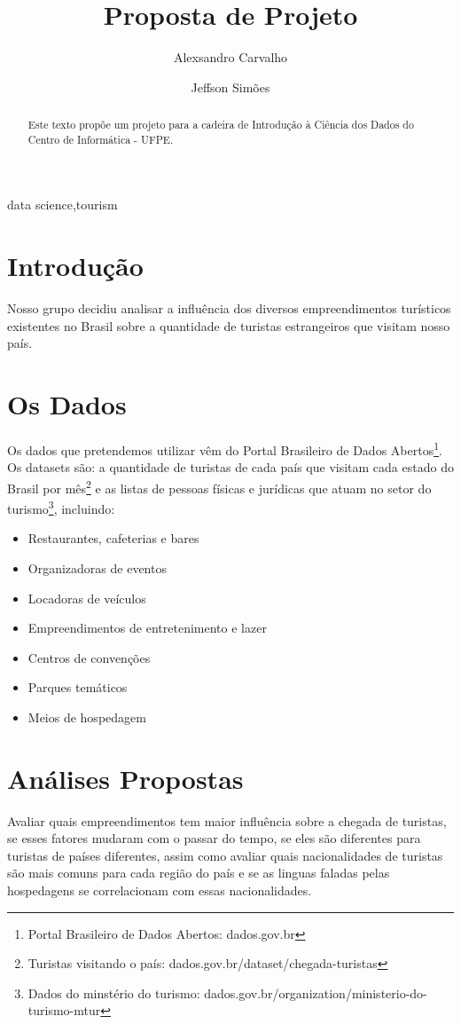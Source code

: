 \documentclass[review]{elsarticle}
\begin{document}
\begin{frontmatter}

\title{Proposta de Projeto}

\author{Alexsandro Carvalho}

\author{Jeffson Simões}

\begin{abstract}
Este texto propõe um projeto para a cadeira de Introdução à Ciência dos Dados do Centro de Informática - UFPE.
\end{abstract}

\begin{keyword}
data science\sep tourism
\end{keyword}

\end{frontmatter}

\linenumbers

\section{Introdução}
Nosso grupo decidiu analisar a influência dos diversos empreendimentos turísticos existentes no Brasil sobre a quantidade de turistas estrangeiros que visitam nosso país.

\section{Os Dados}
Os dados que pretendemos utilizar vêm do Portal Brasileiro de Dados Abertos\footnote{Portal Brasileiro de Dados Abertos: dados.gov.br}. Os datasets são: a quantidade de turistas de cada país que visitam cada estado do Brasil por mês\footnote{Turistas visitando o país: dados.gov.br/dataset/chegada-turistas} e as listas de pessoas físicas e jurídicas que atuam no setor do turismo\footnote{Dados do minstério do turismo: dados.gov.br/organization/ministerio-do-turismo-mtur}, incluindo:
\begin{itemize}
\item Restaurantes, cafeterias e bares
\item Organizadoras de eventos
\item Locadoras de veículos
\item Empreendimentos de entretenimento e lazer
\item Centros de convenções
\item Parques temáticos
\item Meios de hospedagem
\end{itemize}

\section{Análises Propostas}
Avaliar quais empreendimentos tem maior influência sobre a chegada de turistas, se esses fatores mudaram com o passar do tempo, se eles são diferentes para turistas de países diferentes, assim como avaliar quais nacionalidades de turistas são mais comuns para cada região do país e se as linguas faladas pelas hospedagens se correlacionam com essas nacionalidades.
\end{document}
